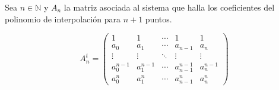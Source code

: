 \begin{frame}
	\begin{solution}
		Sea $n\in\mathbb{N}$ y $A_{n}$ la matriz asociada al sistema
		que halla los coeficientes del polinomio de interpolación
		para $n+1$ puntos.

		\begin{equation*}
			A^{t}_{n}=
			\begin{pmatrix}
				1         & 1         & \cdots & 1             & 1           \\
				a_0       & a_1       & \cdots & a_{n-1}       & a_{n}       \\
				\vdots    & \vdots    & \ddots & \vdots        & \vdots      \\
				a_0^{n-1} & a_1^{n-1} & \cdots & a_{n-1}^{n-1} & a_{n}^{n-1} \\
				a_0^{n}   & a_1^{n}   & \cdots & a_{n-1}^{n}   & a_{n}^{n}
			\end{pmatrix}
		\end{equation*}
	\end{solution}
\end{frame}
